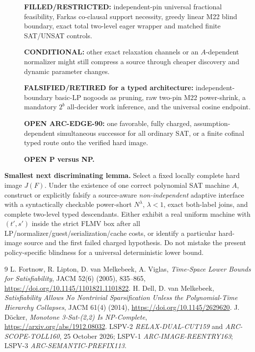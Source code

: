 \documentclass[11pt]{article}
\begin{document}
\begin{description}
\item[] \textbf{FILLED/RESTRICTED:} independent-pin universal fractional
feasibility, Farkas co-clausal support necessity, greedy linear
M22 blind boundary, exact total two-level eager wrapper and
matched finite SAT/UNSAT controls.
\item[] \textbf{CONDITIONAL:} other exact relaxation channels
or an \(A\)-dependent normalizer might still compress a source
through cheaper discovery and dynamic parameter changes.
\item[] \textbf{FALSIFIED/RETIRED for a typed architecture:}
independent-boundary basic-LP nogoods as pruning,
raw two-pin M22 power-shrink, a mandatory \(2^b\)
all-decider work inference, and the universal cosine endpoint.
\item[] \textbf{OPEN ARC-EDGE-90:} one favorable, fully charged,
assumption-dependent simultaneous successor for all ordinary SAT,
or a finite cofinal typed route onto the verified hard image.
\item[] \textbf{OPEN P versus NP.}
\end{description}

\textbf{Smallest next discriminating lemma.}
Select a fixed locally complete hard image \(J(F)\).
Under the existence of one correct polynomial SAT machine \(A\),
construct or explicitly falsify a source-aware
\emph{non-independent} adaptive interface with
a syntactically checkable power-short \(N^\lambda\),
\(\lambda<1\), exact both-label joins,
and complete two-level typed descendants.
Either exhibit a real uniform machine with
\((t',s')\) inside the strict FLMV box after all
LP/normalizer/guest/serialization/cache costs, or identify a
particular hard-image source and the first failed charged
hypothesis. Do not mistake the present policy-specific
blindness for a universal deterministic lower bound.
\begin{thebibliography}{9}
L. Fortnow, R. Lipton, D. van Melkebeek, A. Viglas,
\emph{Time-Space Lower Bounds for Satisfiability},
JACM 52(6) (2005), 835--865,
\url{https://doi.org/10.1145/1101821.1101822}.
H. Dell, D. van Melkebeek, \emph{Satisfiability Allows No
Nontrivial Sparsification Unless the Polynomial-Time
Hierarchy Collapses}, JACM 61(4) (2014),
\url{https://doi.org/10.1145/2629620}.
J. D\"ocker, \emph{Monotone 3-Sat-(2,2) Is NP-Complete},
\url{https://arxiv.org/abs/1912.08032}.
LSPV-2 \emph{RELAX-DUAL-CUT159} and
\emph{ARC-SCOPE-TOLL160}, 25 October 2026;
LSPV-1 \emph{ARC-IMAGE-REENTRY163};
LSPV-3 \emph{ARC-SEMANTIC-PREFIX113}.
\end{thebibliography}
\end{document}
